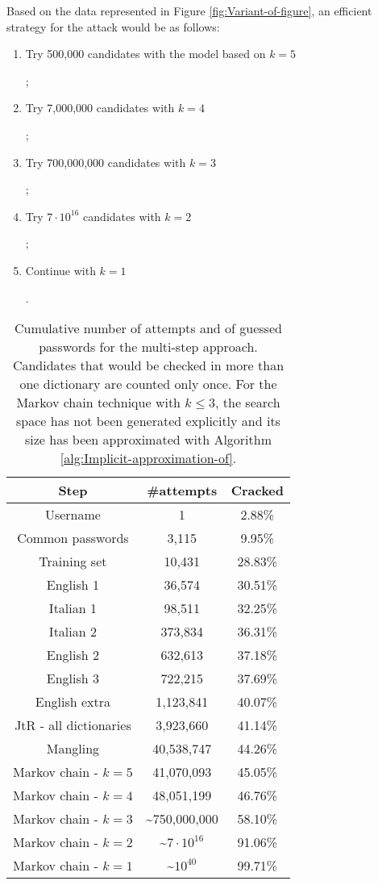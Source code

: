 \documentclass[a4paper,twocolumn]{article}
\providecommand{\tabularnewline}{\\}
\begin{document}
Based on the data represented in Figure \ref{fig:Variant-of-figure},
an efficient strategy for the attack would be as follows:
\begin{enumerate}
\item Try 500,000 candidates with the model based on $k=5$\begin{comment}
 $t=10^{-8}$
\end{comment}
{};
\item Try 7,000,000 candidates with $k=4$\begin{comment}
 $t=7\cdot10^{-9}$
\end{comment}
{};
\item Try 700,000,000 candidates with $k=3$\begin{comment}
 $t=1.05\cdot10^{-10}$
\end{comment}
{};
\item Try $7\cdot10^{16}$ candidates with $k=2$ \begin{comment}
 $t=8\cdot10^{-20}$
\end{comment}
{};
\item Continue with $k=1$\begin{comment}
 $t=4\cdot10^{-46}$
\end{comment}
{}.
\end{enumerate}
\begin{table}
\begin{centering}
\begin{tabular}{|c|c|c|}
\hline 
Step & \#attempts & Cracked\tabularnewline
\hline
\hline 
Username & 1 & 2.88\%\tabularnewline
\hline 
Common passwords & 3,115 & 9.95\%\tabularnewline
\hline 
Training set & 10,431 & 28.83\%\tabularnewline
\hline 
English 1 & 36,574 & 30.51\%\tabularnewline
\hline 
Italian 1 & 98,511 & 32.25\%\tabularnewline
\hline 
Italian 2 & 373,834 & 36.31\%\tabularnewline
\hline 
English 2 & 632,613 & 37.18\%\tabularnewline
\hline 
English 3 & 722,215 & 37.69\%\tabularnewline
\hline 
English extra & 1,123,841 & 40.07\%\tabularnewline
\hline 
JtR - all dictionaries & 3,923,660 & 41.14\%\tabularnewline
\hline 
Mangling & 40,538,747 & 44.26\%\tabularnewline
\hline 
Markov chain - $k=5$ & 41,070,093 & 45.05\%\tabularnewline
\hline 
Markov chain - $k=4$ & 48,051,199 & 46.76\%\tabularnewline
\hline 
Markov chain - $k=3$ & \textasciitilde{}750,000,000 & 58.10\%\tabularnewline
\hline 
Markov chain - $k=2$ & \textasciitilde{}$7\cdot10^{16}$ & 91.06\%\tabularnewline
\hline 
Markov chain - $k=1$ & \textasciitilde{}$10^{40}$ & 99.71\%\tabularnewline
\hline
\end{tabular}
\par\end{centering}

\caption{\label{tab:Dictionary-based-multi-step-approach.}Cumulative number
of attempts and of guessed passwords for the multi-step approach.
Candidates that would be checked in more than one dictionary are counted
only once. For the Markov chain technique with $k\leq3$, the search
space has not been generated explicitly and its size has been approximated
with Algorithm \ref{alg:Implicit-approximation-of}.}

\end{table}
\end{document}
